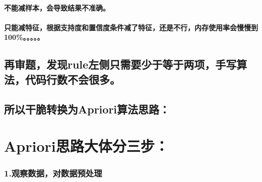 \documentclass[11pt]{article}
\begin{document}
\hypertarget{ux4e0dux80fdux51cfux6837ux672cux4f1aux5bfcux81f4ux7ed3ux679cux4e0dux51c6ux786e}{%
\paragraph{不能减样本，会导致结果不准确。}\label{ux4e0dux80fdux51cfux6837ux672cux4f1aux5bfcux81f4ux7ed3ux679cux4e0dux51c6ux786e}}

\hypertarget{ux53eaux80fdux51cfux7279ux5f81ux6839ux636eux652fux6301ux5ea6ux548cux7f6eux4fe1ux5ea6ux6761ux4ef6ux51cfux4e86ux7279ux5f81ux8fd8ux662fux4e0dux884cux5185ux5b58ux4f7fux7528ux7387ux4f1aux6162ux6162ux5230100}{%
\paragraph{只能减特征，根据支持度和置信度条件减了特征，还是不行，内存使用率会慢慢到100\%。。。。。}\label{ux53eaux80fdux51cfux7279ux5f81ux6839ux636eux652fux6301ux5ea6ux548cux7f6eux4fe1ux5ea6ux6761ux4ef6ux51cfux4e86ux7279ux5f81ux8fd8ux662fux4e0dux884cux5185ux5b58ux4f7fux7528ux7387ux4f1aux6162ux6162ux5230100}}

    \hypertarget{ux518dux5ba1ux9898ux53d1ux73b0ruleux5de6ux4fa7ux53eaux9700ux8981ux5c11ux4e8eux7b49ux4e8eux4e24ux9879ux624bux5199ux7b97ux6cd5ux4ee3ux7801ux884cux6570ux4e0dux4f1aux5f88ux591a}{%
\subsection{再审题，发现rule左侧只需要少于等于两项，手写算法，代码行数不会很多。}\label{ux518dux5ba1ux9898ux53d1ux73b0ruleux5de6ux4fa7ux53eaux9700ux8981ux5c11ux4e8eux7b49ux4e8eux4e24ux9879ux624bux5199ux7b97ux6cd5ux4ee3ux7801ux884cux6570ux4e0dux4f1aux5f88ux591a}}

\hypertarget{ux6240ux4ee5ux5e72ux8106ux8f6cux6362ux4e3aaprioriux7b97ux6cd5ux601dux8def}{%
\subsection{所以干脆转换为Apriori算法思路：}\label{ux6240ux4ee5ux5e72ux8106ux8f6cux6362ux4e3aaprioriux7b97ux6cd5ux601dux8def}}

    \hypertarget{aprioriux601dux8defux5927ux4f53ux5206ux4e09ux6b65}{%
\section{Apriori思路大体分三步：}\label{aprioriux601dux8defux5927ux4f53ux5206ux4e09ux6b65}}

\hypertarget{ux89c2ux5bdfux6570ux636eux5bf9ux6570ux636eux9884ux5904ux7406}{%
\subsubsection{1.观察数据，对数据预处理}\label{ux89c2ux5bdfux6570ux636eux5bf9ux6570ux636eux9884ux5904ux7406}}
\end{document}
